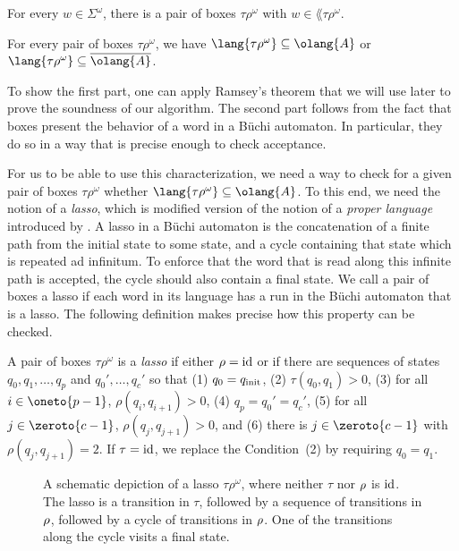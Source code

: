 \documentclass[../../diss.tex]{subfiles}
\begin{document}
\begin{lemma}%
\label{Lemma:EDSOmegaRegInclBoxesProperties}%
    \begin{thmenumerate}[a)]
        \item For every $w \in \Sigma^\omega$, there is a pair of boxes $\tau\rho^\omega$ with $w \in \lang{\tau\rho^\omega}$.
        \item For every pair of boxes $\tau\rho^\omega$, we have $\lang{\tau\rho^\omega} \subseteq \olang{A}$ or $\lang{\tau\rho^\omega} \subseteq \overline{\olang{A}}$.
    \end{thmenumerate}
\end{lemma}

To show the first part, one can apply Ramsey's theorem that we will use later to prove the soundness of our algorithm.
The second part follows from the fact that boxes present the behavior of a word in a Büchi automaton.
In particular, they do so in a way that is precise enough to check acceptance.

For us to be able to use this characterization, we need a way to check for a given pair of boxes $\tau \rho^\omega$ whether $\lang{\tau \rho^\omega} \subseteq \olang{A}$.
To this end, we need the notion of a \emph{lasso}, which is modified version of the notion of a \emph{proper language} introduced by .
A lasso in a Büchi automaton is the concatenation of a finite path from the initial state to some state, and a cycle containing that state which is repeated ad infinitum.
To enforce that the word that is read along this infinite path is accepted, the cycle should also contain a final state.
We call a pair of boxes a lasso if each word in its language has a run in the Büchi automaton that is a lasso.
The following definition makes precise how this property can be checked.

\begin{definition}
    A pair of boxes $\tau\rho^\omega$ is a \emph{lasso} if either $\rho = \text{id}$ or if there are sequences of states $q_0,q_1, \ldots, q_p$ and $q_0', \ldots, q_c'$ so that
    (1) $q_0 = q_{\text{init}}$,
    (2) $\tau(q_0,q_1) > 0$,
    (3) for all $i \in \oneto{p-1}$, $\rho(q_i,q_{i+1}) > 0$,
    (4) $q_p = q_0' = q_c'$,
    (5) for all $j \in \zeroto{c-1}$, $\rho(q_j,q_{j+1}) > 0$, and
    (6) there is $j \in \zeroto{c-1}$ with $\rho(q_j,q_{j+1}) = 2$.
    If $\tau = \text{id}$, we replace the Condition~(2) by requiring $q_0 = q_1$.
\end{definition}

\begin{figure}[t]
    \centering%
    \caption{A schematic depiction of a lasso $\tau\rho^\omega$, where neither $\tau$ nor $\tbox$ is $\text{id}$. The lasso is a transition in $\tau$, followed by a sequence of transitions in $\tbox$, followed by a cycle of transitions in $\tbox$. One of the transitions along the cycle visits a final state.}%
    \label{Figure:Lasso}
\end{figure}
\end{document}

